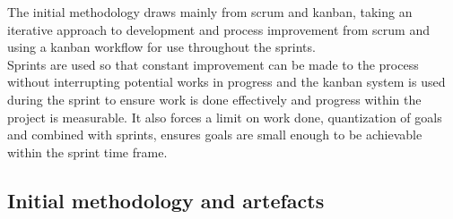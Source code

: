 The initial methodology draws mainly from scrum\cite{PersonalScrum} and kanban\cite{PersonalKanban}, taking an iterative approach to development and process improvement from scrum and using a kanban workflow for use throughout the sprints.\\

Sprints are used so that constant improvement can be made to the process without interrupting potential works in progress and the kanban system is used during the sprint to ensure work is done effectively and progress within the project is measurable. It also forces a limit on work done, quantization of goals and combined with sprints, ensures goals are small enough to be achievable within the sprint time frame.
\subsection{Initial methodology and artefacts}
